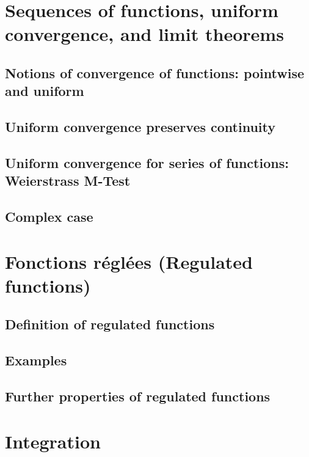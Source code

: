 \documentclass[10pt, a4paper]{article}
\begin{document}
\newpage

\section{Sequences of functions, uniform convergence, and limit theorems}

\subsection{Notions of convergence of functions: pointwise and uniform}

\subsection{Uniform convergence preserves continuity}

\subsection{Uniform convergence for series of functions: Weierstrass M-Test}

\subsection{Complex case}

\newpage

\section{Fonctions réglées (Regulated functions)}

\subsection{Definition of regulated functions}

\subsection{Examples}

\subsection{Further properties of regulated functions}

\newpage

\section{Integration}
\end{document}
